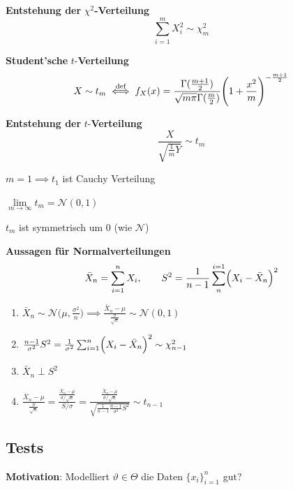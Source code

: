 \remark \textbf{Entstehung der } $\chi^2$\textbf{-Verteilung}\\
$$
    \sum_{i=1}^{m} X_i^2 \sim \chi_m^2
$$

\newpage

 \textbf{Student'sche} $t$-\textbf{Verteilung}
$$
    X \sim t_m \overset{\text{def}}{\iff} f_X(x) = \frac{\Gamma(\frac{m+1}{2})}{\sqrt{m\pi}\Gamma(\frac{m}{2})}\Biggl( 1+\frac{x^2}{m} \Biggr)^{-\frac{m+1}{2}}
$$

\remark \textbf{Entstehung der } $t$-\textbf{Verteilung}\\
$$
    \frac{X}{\sqrt{\frac{1}{m}Y}} \sim t_m
$$

{\footnotesize
    \remark $m=1 \implies t_1$ ist Cauchy Verteilung

    \remark $\underset{m\to\infty}{\lim} t_m = \mathcal{N}(0,1)$

    \remark $t_m$ ist symmetrisch um $0$ (wie $\mathcal{N}$)
}

\theorem \textbf{Aussagen für Normalverteilungen}\\
$$
    \bar{X}_n = \sum_{i=1}^{n}X_i,\qquad S^2 = \frac{1}{n-1}\sum_{n}^{i=1}\Bigl( X_i - \bar{X}_n \Bigr)^2
$$
\begin{enumerate}
    \item $\bar{X}_n \sim \mathcal{N}\bigl(\mu, \frac{\sigma^2}{n}\bigr) \implies \displaystyle\frac{\bar{X}_n - \mu}{\frac{\sigma}{\sqrt{n}}} \sim \mathcal{N}(0,1)$
    \item $\frac{n-1}{\sigma^2}S^2 = \frac{1}{\sigma^2}\sum_{i=1}^n\Bigl( X_i - \bar{X}_n \Bigr)^2 \sim \chi^2_{n-1}$
    \item $\bar{X}_n \perp S^2$
    \item $\frac{\bar{X}_n-\mu}{\frac{S}{\sqrt{n}}} = \displaystyle\frac{\frac{\bar{X}_n - \mu}{\sigma / \sqrt{n}}}{S / \sigma} = \frac{\frac{\bar{X}_n - \mu}{\sigma / \sqrt{n}}}{\sqrt{\frac{1}{n-1}\frac{n-1}{\sigma^2}S^2}} \sim t_{n-1}$
\end{enumerate}

\newpage

\subsection{Tests}

\textbf{Motivation}: Modelliert $\vartheta\in\Theta$ die Daten $\{x_i\}_{i=1}^n$ gut?

